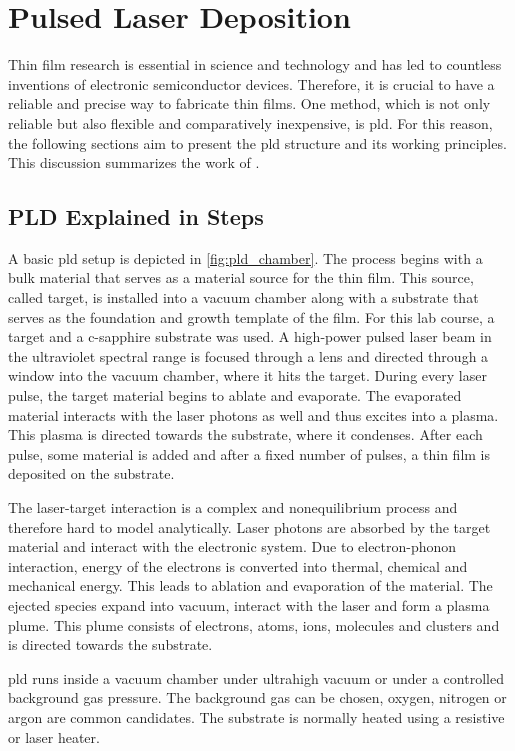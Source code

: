 \section{Pulsed Laser Deposition}
Thin film research is essential in science and 
technology and has led to countless inventions of electronic semiconductor devices.
Therefore, it is crucial to have a reliable and precise way to fabricate thin films. 
One method, which is not only reliable but also flexible and comparatively inexpensive,
is \ac{pld}. 
For this reason, the following sections aim to present the \ac{pld} structure and its 
working principles.
This discussion summarizes the work of \citeauthor{lorenz} \cite{lorenz}.

\subsection{PLD Explained in Steps}
A basic \ac{pld} setup is depicted in \cref{fig:pld_chamber}.
The process begins with a bulk material that serves as a material source for the thin 
film.
This source, called target, is installed into a vacuum chamber along with a 
substrate that serves as the foundation and growth template of the film.
For this lab course, a  target and a c-sapphire substrate was used.
A high-power pulsed laser beam in the ultraviolet spectral range is focused through a 
lens and directed through a window into the vacuum chamber, where it hits the target. 
During every laser pulse, the target material begins to ablate and evaporate. 
The evaporated material interacts with the laser photons as well and thus excites into a 
plasma. 
This plasma is directed towards the substrate, where it condenses.
After each pulse, some material is added and after a fixed number of pulses,
a thin film is deposited on the substrate. 

The laser-target interaction is a complex and nonequilibrium process and therefore
hard to model analytically.
Laser photons are absorbed by the target material and interact with the electronic 
system.
Due to electron-phonon interaction, energy of the electrons is converted 
into thermal, chemical and mechanical energy.
This leads to ablation and evaporation of the material.
The ejected species expand into vacuum, interact with the laser and form a plasma
plume. 
This plume consists of electrons, atoms, ions, molecules and clusters and is directed 
towards the substrate.

\ac{pld} runs inside a vacuum chamber under ultrahigh vacuum or under a controlled 
background gas pressure.
The background gas can be chosen, oxygen, nitrogen or argon are common candidates.
The substrate is normally heated using a resistive or laser heater.

